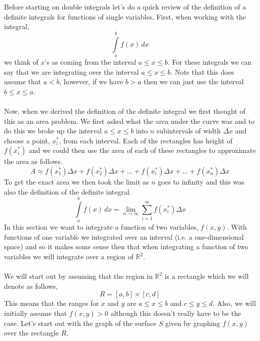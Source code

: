 \documentclass[10pt,reqno]{book}
\theoremstyle{definition}
\def\R{\mathbb{R}}
\begin{document}
	Before starting on double integrals let's do a quick review of the definition of a definite integrals for functions of single variables. First, when working with the integral,
	\[ \int\limits_a^b f(x)\,dx \]
	we think of $ x $'s as coming from the interval $ a \leq x \leq b $. For these integrals we can say that we are integrating over the interval $ a \leq x \leq b $. Note that this does assume that $ a<b $, however, if we have $ b>a $ then we can just use the interval $ b \leq x \leq a $.\\ \\
	Now, when we derived the definition of the definite integral we first thought of this as an area problem. We first asked what the area under the curve was and to do this we broke up the interval $ a \leq x \leq b $ into $ n $ subintervals of width $ \Delta x $ and choose a point,  $ x_i^* $, from each interval. Each of the rectangles has height of $ f(x_i^*) $  and we could then use the area of each of these rectangles to approximate the area as follows.
	\[ A \approx f(x_1^*) \Delta x + f(x_2^*) \Delta x + \ldots + f(x_i^*) \Delta x + \ldots + f(x_n^*) \Delta x  \]
	To get the exact area we then took the limit as $ n $ goes to infinity and this was also the definition of the definite integral.
	\[ \int\limits_a^b f(x)\,dx = \lim_{n \to \infty} \sum_{i=1}^{\infty} f(x_i^*) \Delta x \]
	In this section we want to integrate a function of two variables, $ f(x,y) $. With functions of one variable we integrated over an interval (i.e. a one-dimensional space) and so it makes some sense then that when integrating a function of two variables we will integrate over a region of $ \R^2 $.\\ \\
	We will start out by assuming that the region in $ \R^2 $ is a rectangle which we will denote as follows,
	\[ R = [ a,b ] \times [ c,d ] \]
	This means that the ranges for $ x $ and $ y $ are $ a \leq x \leq b $ and $ c \leq y \leq d $. Also, we will initially assume that $ f(x,y) > 0 $ although this doesn't really have to be the case. Let's start out with the graph of the surface $ S $ given by graphing $ f(x,y) $ over the rectangle $ R $.
	
\end{document}

